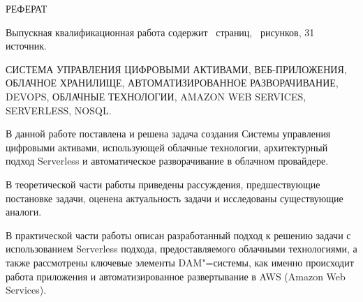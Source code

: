 \begin{center}
  РЕФЕРАТ
\end{center}

Выпускная квалификационная работа содержит \pageref{LastPage}\ страниц, \totalfigures\ рисунков, 31 источник.


\noindent \justify \sloppy СИСТЕМА УПРАВЛЕНИЯ ЦИФРОВЫМИ АКТИВАМИ, ВЕБ-ПРИЛОЖЕНИЯ, ОБЛАЧНОЕ ХРАНИЛИЩЕ, АВТОМАТИЗИРОВАННОЕ РАЗВОРАЧИВАНИЕ, DEVOPS, ОБЛАЧНЫЕ ТЕХНОЛОГИИ, AMAZON WEB SERVICES, SERVERLESS, NOSQL.


В данной работе поставлена и решена задача создания Системы управления цифровыми активами, использующей облачные технологии, архитектурный подход Serverless и автоматическое разворачивание в облачном провайдере.

В теоретической части работы приведены рассуждения, предшествующие постановке задачи, оценена актуальность задачи и исследованы существующие аналоги.

В практической части работы описан разработанный подход к решению задачи с использованием Serverless подхода, предоставляемого облачными технологиями, а также рассмотрены ключевые элементы DAM"=системы, как именно происходит работа приложения и автоматизированное развертывание в AWS (Amazon Web Services).
\pagebreak